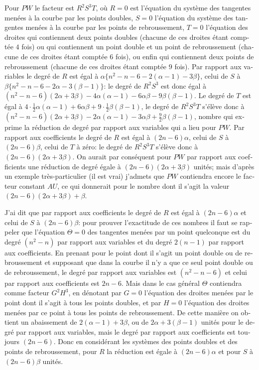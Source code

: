 \documentclass[11pt,a4paper]{article}
\begin{document}
\begin{otherlanguage}{french}
Pour $PW$ le facteur est $R^{2}S^{3}T$, o\`u $R = 0$ est l'\'equation du syst\`eme des tangentes men\'ees \`a la courbe par les points doubles, $S = 0$ l'\'equation du syst\`eme des tangentes men\'ees \`a la courbe par les points de rebroussement, $T = 0$ l'\'equation des droites qui contiennent deux points doubles (chacune de ces droites \'etant compt\'ee $4$ fois) ou qui contiennent un point double et un point de rebroussement (chacune de ces droites \'etant compt\'ee $6$ fois), ou enfin qui contiennent deux points de rebroussement (chacune de ces droites \'etant compt\'ee $9$ fois). Par rapport aux variables le degr\'e de $R$ est \'egal \`a $\alpha\{n^{2} - n - 6 - 2(\alpha - 1) - 3\beta\}$, celui de $S$ \`a $\beta\{n^{2} - n - 6 - 2\alpha - 3(\beta - 1)\}$: le degr\'e de $R^{2}S^{3}$ est donc \'egal \`a $(n^{2} - n - 6)(2\alpha + 3\beta) - 4\alpha(\alpha - 1) - 6\alpha\beta - 9\beta(\beta - 1)$. Le degr\'e de $T$ est \'egal \`a $4\cdot\tfrac{1}{2}\alpha(\alpha - 1) + 6\alpha\beta + 9\cdot\tfrac{1}{2}\beta(\beta - 1)$, le degr\'e de $R^{2}S^{3}T$ s'\'el\`eve donc \`a $(n^{2} - n - 6)(2\alpha + 3\beta) - 2\alpha(\alpha - 1) - 3\alpha\beta + \tfrac{9}{2}\beta(\beta - 1)$, nombre qui exprime la r\'eduction de degr\'e par rapport aux variables qui a lieu pour $PW$. Par rapport aux coefficients le degr\'e de $R$ est \'egal \`a $(2n - 6)\alpha$, celui de $S$ \`a $(2n - 6)\beta$, celui de $T$ \`a z\'ero: le degr\'e de $R^{2}S^{3}T$ s'\'el\`eve donc \`a $(2n - 6)(2\alpha + 3\beta)$. On aurait par cons\'equent pour $PW$ par rapport aux coefficients une r\'eduction de degr\'e \'egale \`a $(2n - 6)(2\alpha + 3\beta)$ unit\'es; mais d'apr\`es un exemple tr\`es-particulier (il est vrai) j'admets que $PW$ contiendra encore le facteur constant $AU$, ce qui donnerait pour le nombre dont il s'agit la valeur $(2n - 6)(2\alpha + 3\beta) + \beta$.

J'ai dit que par rapport aux coefficients le degr\'e de $R$ est \'egal \`a $(2n - 6)\alpha$ et celui de $S$ \`a $(2n - 6)\beta$: pour prouver l'exactitude de ces nombres il faut se rappeler que l'\'equation $\Theta = 0$ des tangentes men\'ees par un point quelconque est du degr\'e $(n^{2} - n)$ par rapport aux variables et du degr\'e $2(n - 1)$ par rapport aux coefficients. En prenant pour le point dont il s'agit un point double ou de rebroussement et supposant que dans la courbe il n'y a que ce seul point double ou de rebroussement, le degr\'e par rapport aux variables est $(n^{2} - n - 6)$ et celui par rapport aux coefficients est $2n - 6$. Mais dans le cas g\'en\'eral $\Theta$ contiendra comme facteur $G^{2}H^{3}$, en d\'enotant par $G = 0$ l'\'equation des droites men\'ees par le point dont il s'agit \`a tous les points doubles, et par $H = 0$ l'\'equation des droites men\'ees par ce point \`a tous les points de rebroussement. De cette mani\`ere on obtient un abaissement de $2(\alpha - 1) + 3\beta$, ou de $2\alpha + 3(\beta - 1)$ unit\'es pour le degr\'e par rapport aux variables, mais le degr\'e par rapport aux coefficients est toujours $(2n - 6)$. Donc en consid\'erant les syst\`emes des points doubles et des points de rebroussement, pour $R$ la r\'eduction est \'egale \`a $(2n - 6)\alpha$ et pour $S$ \`a $(2n - 6)\beta$ unit\'es.


\end{otherlanguage}
\end{document}
